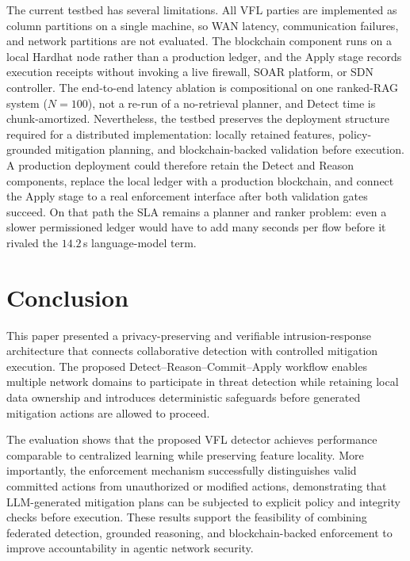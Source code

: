 \documentclass[10pt, conference]{IEEEtran}
\begin{document}
The current testbed has several limitations. All VFL parties are implemented as column partitions on a single machine, so WAN latency, communication failures, and network partitions are not evaluated. The blockchain component runs on a local Hardhat node rather than a production ledger, and the Apply stage records execution receipts without invoking a live firewall, SOAR platform, or SDN controller. The end-to-end latency ablation is compositional on one ranked-RAG system (\(N{=}100\)), not a re-run of a no-retrieval planner, and Detect time is chunk-amortized. Nevertheless, the testbed preserves the deployment structure required for a distributed implementation: locally retained features, policy-grounded mitigation planning, and blockchain-backed validation before execution. A production deployment could therefore retain the Detect and Reason components, replace the local ledger with a production blockchain, and connect the Apply stage to a real enforcement interface after both validation gates succeed. On that path the SLA remains a planner and ranker problem: even a slower permissioned ledger would have to add many seconds per flow before it rivaled the $14.2$\,s language-model term.
\section{Conclusion} 
\label{sec:conclusion}

This paper presented a privacy-preserving and verifiable intrusion-response architecture that connects collaborative detection with controlled mitigation execution. The proposed Detect--Reason--Commit--Apply workflow enables multiple network domains to participate in threat detection while retaining local data ownership and introduces deterministic safeguards before generated mitigation actions are allowed to proceed.

The evaluation shows that the proposed VFL detector achieves performance comparable to centralized learning while preserving feature locality. More importantly, the enforcement mechanism successfully distinguishes valid committed actions from unauthorized or modified actions, demonstrating that LLM-generated mitigation plans can be subjected to explicit policy and integrity checks before execution. These results support the feasibility of combining federated detection, grounded reasoning, and blockchain-backed enforcement to improve accountability in agentic network security.
\end{document}
